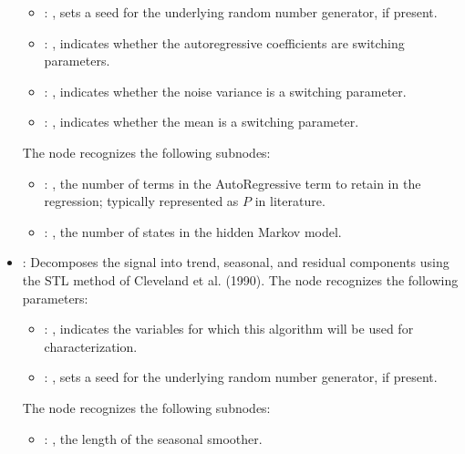 \begin{itemize}
\begin{itemize}
          \item {}: , 
            sets a seed for the underlying random number generator, if present.
          \item {}: , 
            indicates whether the autoregressive coefficients are switching parameters. 
          \item {}: , 
            indicates whether the noise variance is a switching parameter. 
          \item {}: , 
            indicates whether the mean is a switching parameter. 
      \end{itemize}

      The  node recognizes the following subnodes:
      \begin{itemize}
        \item {}: , 
          the number of terms in the AutoRegressive term to retain in the
          regression; typically represented as $P$ in literature.

        \item {}: , 
          the number of states in the hidden Markov model.
      \end{itemize}

    \item {}:
       Decomposes the signal into trend, seasonal, and residual components using the STL method of
      Cleveland et al. (1990).
      The  node recognizes the following parameters:
        \begin{itemize}
          \item {}: , 
            indicates the variables for which this algorithm will be used for characterization.
          \item {}: , 
            sets a seed for the underlying random number generator, if present.
      \end{itemize}

      The  node recognizes the following subnodes:
      \begin{itemize}
        \item {}: , 
          the length of the seasonal smoother.


\end{itemize}
\end{itemize}
